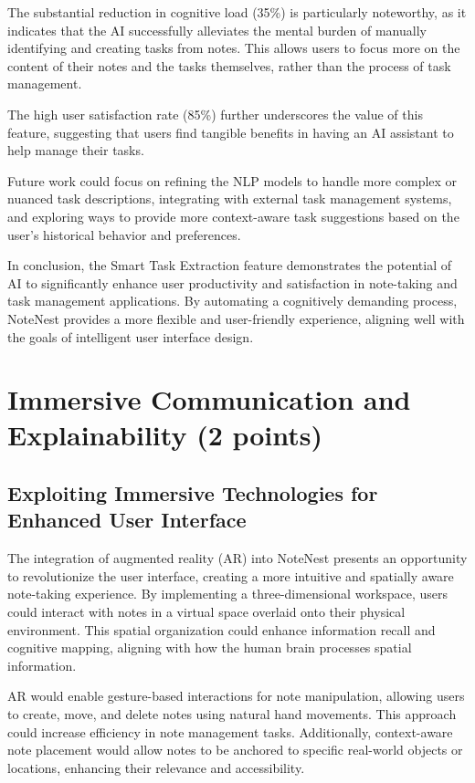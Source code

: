 \documentclass[a4paper, 12pt]{article}
\begin{document}
The substantial reduction in cognitive load (35\%) is particularly noteworthy, as it indicates that the AI successfully alleviates the mental burden of manually identifying and creating tasks from notes. This allows users to focus more on the content of their notes and the tasks themselves, rather than the process of task management.

The high user satisfaction rate (85\%) further underscores the value of this feature, suggesting that users find tangible benefits in having an AI assistant to help manage their tasks.

Future work could focus on refining the NLP models to handle more complex or nuanced task descriptions, integrating with external task management systems, and exploring ways to provide more context-aware task suggestions based on the user's historical behavior and preferences.

In conclusion, the Smart Task Extraction feature demonstrates the potential of AI to significantly enhance user productivity and satisfaction in note-taking and task management applications. By automating a cognitively demanding process, NoteNest provides a more flexible and user-friendly experience, aligning well with the goals of intelligent user interface design.

\section{Immersive Communication and Explainability (2 points)}

\subsection{Exploiting Immersive Technologies for Enhanced User Interface}

The integration of augmented reality (AR) into NoteNest presents an opportunity to revolutionize the user interface, creating a more intuitive and spatially aware note-taking experience. By implementing a three-dimensional workspace, users could interact with notes in a virtual space overlaid onto their physical environment. This spatial organization could enhance information recall and cognitive mapping, aligning with how the human brain processes spatial information.

AR would enable gesture-based interactions for note manipulation, allowing users to create, move, and delete notes using natural hand movements. This approach could increase efficiency in note management tasks. Additionally, context-aware note placement would allow notes to be anchored to specific real-world objects or locations, enhancing their relevance and accessibility.
\end{document}
